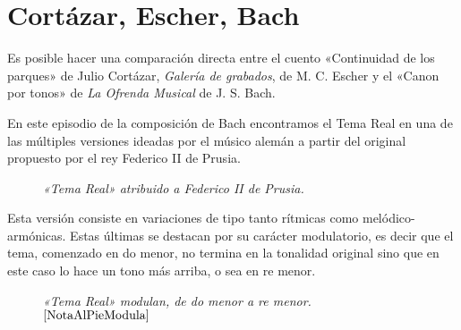 \chapter {Cortázar, Escher, Bach}
Es posible hacer una comparación directa entre el cuento «Continuidad de los parques» de Julio Cortázar, \emph{Galería de grabados}, de M. C. Escher y el «Canon por tonos» de \emph{La Ofrenda Musical} de J. S. Bach.

En este episodio de la composición de Bach encontramos el Tema Real en una de las múltiples versiones ideadas por el músico alemán a partir del original propuesto por el rey Federico II de Prusia.

\begin{figure}[H]
\begin{center}
\end{center}
\caption{\emph{«Tema Real» atribuido a Federico II de Prusia.}}
\label{ceb:temareal}
\end{figure}

\noindent Esta versión consiste en variaciones de tipo tanto rítmicas como melódico-armónicas. Estas últimas se destacan por su carácter modulatorio, es decir que el tema, comenzado en do menor, no termina en la tonalidad original sino que en este caso lo hace un tono más arriba, o sea en re menor.

\begin{figure}[H]
\begin{center}
\end{center}
\caption{\emph{«Tema Real» modulan, de do menor a re menor.
}$^{\ref{NotaAlPieModula}}$}
\label{ceb:temamodulado}
\end{figure}

\addtocounter{footnote}{1}

